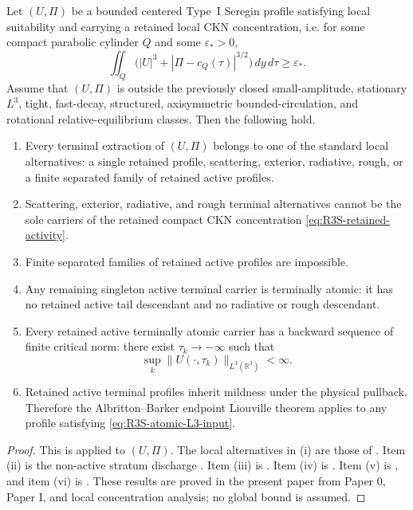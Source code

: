 \begin{theorem}
\label{thm:R3S-terminal-package}
Let \((U,\Pi)\) be a bounded centered Type~I Seregin profile satisfying local
suitability and carrying a retained local CKN concentration, i.e. for some
compact parabolic cylinder \(Q\) and some \(\varepsilon_*>0\),
\begin{equation}\label{eq:R3S-retained-activity}
   \iint_Q\bigl(|U|^3+|\Pi-c_Q(\tau)|^{3/2}\bigr)\,dy\,d\tau
   \ge \varepsilon_* .
\end{equation}
Assume that \((U,\Pi)\) is outside the previously closed small-amplitude,
stationary \(L^3\), tight, fast-decay, structured, axisymmetric
bounded-circulation, and rotational relative-equilibrium classes.  Then the
following hold.
\begin{enumerate}[label=(\roman*)]
   \item Every terminal extraction of \((U,\Pi)\) belongs to one of the standard
   local alternatives: a single retained profile, scattering, exterior,
   radiative, rough, or a finite separated family of retained active profiles.
   \item Scattering, exterior, radiative, and rough terminal alternatives cannot
   be the sole carriers of the retained compact CKN concentration
   \eqref{eq:R3S-retained-activity}.
   \item Finite separated families of retained active profiles are impossible.
   \item Any remaining singleton active terminal carrier is terminally atomic:
   it has no retained active tail descendant and no radiative or rough
   descendant.
   \item Every retained active terminally atomic carrier has a backward sequence
   of finite critical norm: there exist \(\tau_k\to-\infty\) such that
   \begin{equation}\label{eq:R3S-atomic-L3-input}
      \sup_k \|U(\cdot,\tau_k)\|_{L^3(\mathbb R^3)}<\infty .
   \end{equation}
   \item Retained active terminal profiles inherit mildness under the physical
   pullback.  Therefore the Albritton--Barker endpoint Liouville theorem applies
   to any profile satisfying \eqref{eq:R3S-atomic-L3-input}.
\end{enumerate}
\end{theorem}

\begin{proof}
This is  applied to
\((U,\Pi)\).  The local alternatives in (i) are those of
.  Item (ii) is the non-active stratum
discharge .  Item (iii) is
.  Item (iv) is
.  Item (v) is
, and item (vi) is
.  These results are proved in
the present paper from Paper 0, Paper I, and local concentration analysis;
no global bound is assumed.
\end{proof}

